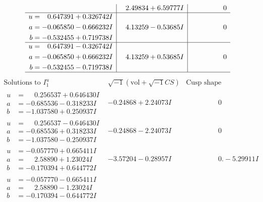 \documentclass[1p]{elsarticle_modified}
\theoremstyle{definition}
\newcommand{\I}{\sqrt{-1}}
\begin{document}
$$\begin{array}{c|c|c}
 & \phantom{-}2.49834 + 6.59777 I & \phantom{-0.000000 } 0 \\ \hline\begin{aligned}
u &= \phantom{-}0.647391 + 0.326742 I \\
a &= -0.065850 - 0.666232 I \\
b &= -0.532455 + 0.719738 I\end{aligned}
 & \phantom{-}4.13259 - 0.53685 I & \phantom{-0.000000 } 0 \\ \hline\begin{aligned}
u &= \phantom{-}0.647391 - 0.326742 I \\
a &= -0.065850 + 0.666232 I \\
b &= -0.532455 - 0.719738 I\end{aligned}
 & \phantom{-}4.13259 + 0.53685 I & \phantom{-0.000000 } 0\\
 \hline 
 \end{array}$$\newpage$$\begin{array}{c|c|c}  
\text{Solutions to }I^u_{1}& \I (\text{vol} + \sqrt{-1}CS) & \text{Cusp shape}\\
 \hline 
\begin{aligned}
u &= \phantom{-}0.256537 + 0.646430 I \\
a &= -0.685536 - 0.318233 I \\
b &= -1.037580 + 0.250937 I\end{aligned}
 & -0.24868 + 2.24073 I & \phantom{-0.000000 } 0 \\ \hline\begin{aligned}
u &= \phantom{-}0.256537 - 0.646430 I \\
a &= -0.685536 + 0.318233 I \\
b &= -1.037580 - 0.250937 I\end{aligned}
 & -0.24868 - 2.24073 I & \phantom{-0.000000 } 0 \\ \hline\begin{aligned}
u &= -0.057770 + 0.665411 I \\
a &= \phantom{-}2.58890 + 1.23024 I \\
b &= -0.170394 + 0.644772 I\end{aligned}
 & -3.57204 - 0.28957 I & \phantom{-0.000000 } 0. - 5.29911 I \\ \hline\begin{aligned}
u &= -0.057770 - 0.665411 I \\
a &= \phantom{-}2.58890 - 1.23024 I \\
b &= -0.170394 - 0.644772 I\end{aligned}

\end{array}$$
\end{document}
